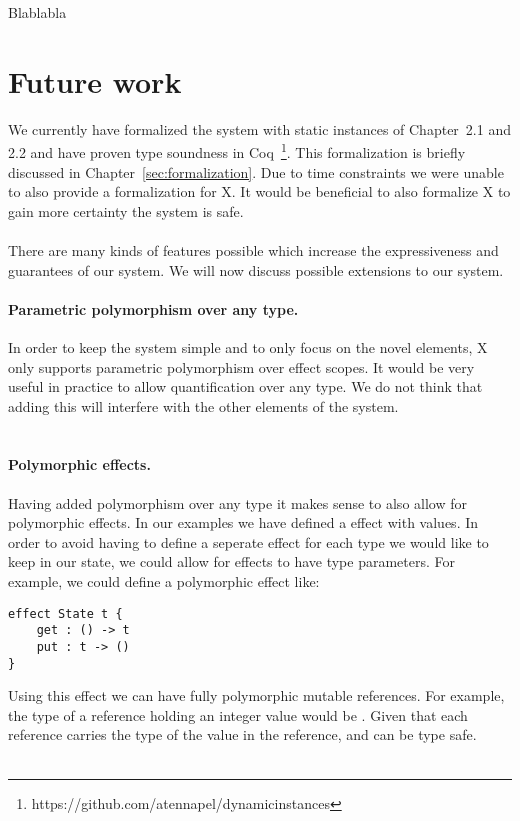 Blablabla

\section{Future work}
We currently have formalized the system with static instances of Chapter~2.1 and 2.2 and have proven type soundness in Coq~\footnote{https://github.com/atennapel/dynamicinstances}.
This formalization is briefly discussed in Chapter~\ref{sec:formalization}.
Due to time constraints we were unable to also provide a formalization for X.
It would be beneficial to also formalize X to gain more certainty the system is safe.
\\\\
There are many kinds of features possible which increase the expressiveness and guarantees of our system.
We will now discuss possible extensions to our system.

\paragraph{Parametric polymorphism over any type.}
In order to keep the system simple and to only focus on the novel elements, X only supports parametric polymorphism over effect scopes.
It would be very useful in practice to allow quantification over any type.
We do not think that adding this will interfere with the other elements of the system.
\\\\
\paragraph{Polymorphic effects.}
Having added polymorphism over any type it makes sense to also allow for polymorphic effects.
In our examples we have defined a  effect with  values.
In order to avoid having to define a seperate effect for each type we would like to keep in our state, we could allow for effects to have type parameters.
For example, we could define a polymorphic  effect like:
\begin{verbatim}
effect State t {
	get : () -> t
	put : t -> ()
}
\end{verbatim}

Using this effect we can have fully polymorphic mutable references.
For example, the type of a reference holding an integer value would be .
Given that each reference carries the type of the value in the reference,  and  can be type safe.
\\\\
